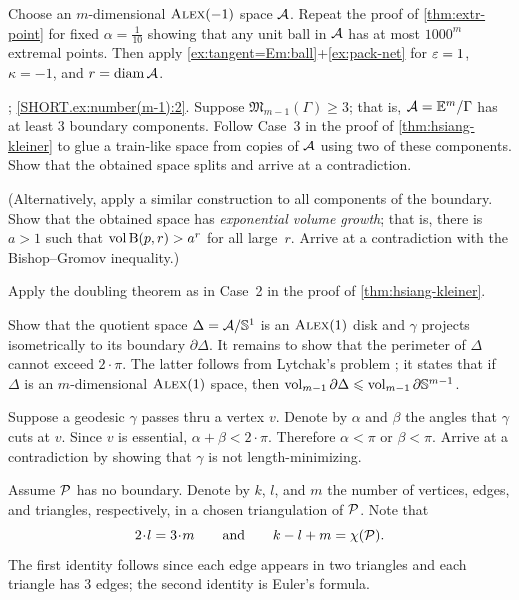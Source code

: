 Choose an $m$-dimensional $\textup{\textsc{Alex}}(-1)$ space $\mathcal{A}$.
Repeat the proof of \ref{thm:extr-point} for fixed $\alpha=\tfrac1{10}$ showing that any unit ball in $\mathcal{A}$ has at most $1000^m$ extremal points.
Then apply \ref{ex:tangent=Em:ball}+\ref{ex:pack-net} for $\varepsilon=1$, $\kappa=-1$, and $r=\operatorname{\rm diam}\nolimits\mathcal{A}$.

\parbf{\ref{ex:number(m-1)}};
\ref{SHORT.ex:number(m-1):2}.
Suppose $\mathfrak{M}_{m-1}(\Gamma)\ge 3$;
that is, $\mathcal{A}=\mathbb{E}^m/\Gamma$ has at least 3 boundary components.
Follow Case~3 in the proof of \ref{thm:hsiang-kleiner} to glue a train-like space from copies of $\mathcal{A}$ using two of these components.
Show that the obtained space splits and arrive at a contradiction.

(Alternatively, apply a similar construction to all components of the boundary.
Show that the obtained space has {}\emph{exponential volume growth};
that is, there is $a>1$ such that $\operatorname{\rm vol}\nolimits \mathrm{B}{}(p,r)>a^r$ for all large~$r$.
Arrive at a contradiction with the Bishop--Gromov inequality.)

Apply the doubling theorem as in Case~2 in the proof of \ref{thm:hsiang-kleiner}.

Show that the quotient space $\Delta=\mathcal{A}/\mathbb{S}^1$ is an $\textup{\textsc{Alex}}(1)$ disk and $\gamma$ projects isometrically to its boundary $\partial\Delta$.
It remains to show that the perimeter of $\Delta$ cannot exceed $2\cdot\pi$.
The latter follows from Lytchak's problem \cite[3.3.5]{petrunin:survey};
it states that if $\Delta$ is an $m$-dimensional $\textup{\textsc{Alex}}(1)$ space, then $\vol_{m-1}\partial \Delta\z\le \vol_{m-1}\partial \mathbb{S}^{m-1}$.

Suppose a geodesic $\gamma$ passes thru a vertex $v$.
Denote by $\alpha$ and $\beta$ the angles that $\gamma$ cuts at $v$.
Since $v$ is essential, $\alpha+\beta<2\cdot\pi$.
Therefore $\alpha<\pi$ or $\beta<\pi$.
Arrive at a contradiction by showing that $\gamma$ is not length-minimizing.

Assume $\mathcal{P}$ has no boundary.
Denote by $k$, $l$, and $m$ the number of vertices, edges, and triangles, respectively, in a chosen triangulation of $\mathcal{P}$.
Note that
\[2\cdot l=3\cdot m
\qquad\text{and}\qquad
k-l+m=\chi(\spc{P}).\]
The first identity follows since each edge appears in two triangles and each triangle has 3 edges;
the second identity is Euler's formula.

